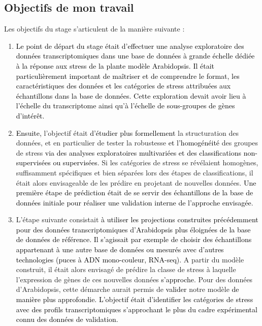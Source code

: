 \documentclass[twoside]{article}
\newcommand{\AR}[1]{\textcolor{black}{#1}}
\begin{document}
    \subsection{Objectifs de mon travail}

\vspace{0.5cm}Les objectifs du stage s'articulent de la manière suivante :

\begin{enumerate}
    \item \vspace{0.5cm}\AR{Le point de départ du stage était d'effectuer une analyse exploratoire des données transcriptomiques dans une base de données à grande échelle dédiée à la réponse aux stress de la plante modèle Arabidopsis. Il était particulièrement important de maîtriser et de comprendre le format, les caractéristiques des données et les catégories de stress attribuées aux échantillons dans la base de données. Cette exploration devait avoir lieu à l'échelle du transcriptome ainsi qu'à l'échelle de sous-groupes de gènes d'intérêt.}  
    
    \item \vspace{0.5cm} \AR{Ensuite,} l'objectif était \AR{d'étudier plus formellement} la structuration des données, et en particulier de tester la robustesse \AR{et l'homogénéité} des groupes de stress \AR{via des analyses exploratoires multivariées et des classifications non-supervisées ou supervisées}. Si les catégories de stress se révélaient homogènes, suffisamment spécifiques et bien séparées lors des étapes de classifications, il était alors envisageable de les prédire en projetant de nouvelles données. \AR{Une première étape de prédiction était de se servir des échantillons de la base de données initiale pour réaliser une validation interne de l'approche envisagée}. 
    
    \item \vspace{0.5cm}L'étape suivante consistait \AR{à utiliser les projections construites précédemment pour des données transcriptomiques d'Arabidopsis plus éloignées de la base de données de référence. Il s'agissait par exemple de choisir des échantillons appartenant à une autre base de données ou mesurés avec d'autres technologies (puces à ADN mono-couleur, RNA-seq).} A partir du modèle construit, il était alors envisagé de prédire la classe de stress à laquelle l'expression de gènes de ces nouvelles données \AR{s'approche}. Pour des données d'Arabidopsis, cette démarche aurait permis de \AR{valider} notre modèle \AR{de manière plus approfondie. L'objectif était d'identifier les catégories de stress avec des profils transcriptomiques s'approchant le plus du cadre expérimental connu des données de validation.} 
    
\end{enumerate}
\end{document}
